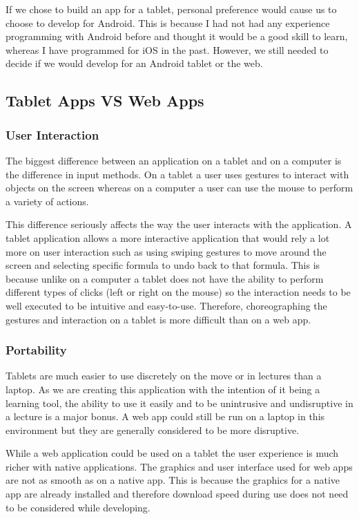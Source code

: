 \documentclass{report}
\begin{document}
If we chose to build an app for a tablet, personal preference would cause us to choose to develop for Android. This is because I had not had any experience programming with Android before and thought it would be a good skill to learn, whereas I have programmed for iOS in the past. However, we still needed to decide if we would develop for an Android tablet or the web.

\subsection{Tablet Apps VS Web Apps}

\subsubsection{User Interaction}

The biggest difference between an application on a tablet and on a computer is the difference in input methods. On a tablet a user uses gestures to interact with objects on the screen whereas on a computer a user can use the mouse to perform a variety of actions.

This difference seriously affects the way the user interacts with the application. A tablet application allows a more interactive application that would rely a lot more on user interaction such as using swiping gestures to move around the screen and selecting specific formula to undo back to that formula. This is because unlike on a computer a tablet does not have the ability to perform different types of clicks (left or right on the mouse) so the interaction needs to be well executed to be intuitive and easy-to-use. Therefore, choreographing the gestures and interaction on a tablet is more difficult than on a web app. 

\subsubsection{Portability}

Tablets are much easier to use discretely on the move or in lectures than a laptop. As we are creating this application with the intention of it being a learning tool, the ability to use it easily and to be unintrusive and undisruptive in a lecture is a major bonus. A web app could still be run on a laptop in this environment but they are generally considered to be more disruptive.

While a web application could be used on a tablet the user experience is much richer with native applications. The graphics and user interface used for web apps are not as smooth as on a native app. This is because the graphics for a native app are already installed and therefore download speed during use does not need to be considered while developing\cite{androidwebappdifferences}.
\end{document}
